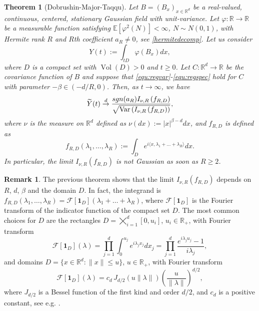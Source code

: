 \documentclass[12pt]{article}
\DeclareMathOperator{\var}{Var}
\DeclareMathOperator{\1}{1}
\DeclareMathOperator{\vol}{Vol}
\newcommand{\R}{\mathbb{R}}
\newcommand{\E}{\mathbb{E}}
\newcommand{\f}{\varphi}
\theoremstyle{plain}
\newtheorem{theorem}{Theorem}
\theoremstyle{definition}
\newtheorem{remark}{Remark}
\begin{document}
\begin{theorem}[Dobrushin-Major-Taqqu]\label{thm:DM}
 Let $B=(B_x)_{x\in\R^d}$ be a real-valued, continuous, centered, stationary Gaussian field with unit-variance. Let $\f:\R \rightarrow \R$ be a measurable function satisfying $\E[\varphi^2(N)]<\infty$, $N\sim N(0,1)$, with Hermite rank $R$ and $R$th coefficient $a_R\neq0$, see \eqref{hermitedecomp}. Let us consider 
 \[
 Y(t):= \int_{tD} \f(B_x) dx,
 \]
 where $D$ is a compact set with $\vol(D)>0$ and $t\ge0$.
 Let $C:\R^d \rightarrow \R$ be the covariance function of $B$ and suppose that \eqref{equ:regvar}-\eqref{equ:regspec} hold for $C$ with parameter $-\beta\in(-d/R,0)$. Then, as $t\rightarrow\infty$, we have 
\begin{equation}
             \widetilde{Y}(t)\overset{d}{\rightarrow} \frac{{\rm sgn(a_R)}I_{\nu,R}\left(f_{R,D}\right)}{\sqrt{\var\left(I_{\nu,R}\left(f_{R,D}\right)\right)}},
         \end{equation}
     where $\nu$ is the measure on $\R^{d}$ defined as $\nu(dx) :=  |x|^{\beta-d} dx$, and $f_{R,D}$ is defined as
     \begin{equation}
    f_{R,D}(\lambda_1,\dots,\lambda_R) := \int_{D} e^{i\langle x,\lambda_1+\dots+\lambda_R\rangle} dx.
\end{equation}
    In particular, the limit $I_{\nu,R}\left(f_{R,D}\right)$ is not Gaussian as soon as $R\ge2$.
 \end{theorem}

\begin{remark}\label{rem:domainsfourier}
    The previous theorem shows that the limit $I_{\nu,R}\left(f_{R,D}\right)$ depends on $R$, $d$, $\beta$ and the domain $D$. In fact, the integrand is $f_{R,D}(\lambda_1,\dots,\lambda_R)=\mathcal{F}[\mathbf{1}_D](\lambda_1+\dots+\lambda_R)$, where  $\mathcal{F}[\mathbf{1}_D]$ is the Fourier transform of the indicator function of the compact set $D$. The most common choices for $D$ are the rectangles $D=\bigtimes_{i=1}^d[0,u_i]$, $u_i\in \R_+$, with Fourier transform 
    \[
    \mathcal{F}[\mathbf{1}_D](\lambda)=\prod_{j=1}^d \int_0^{u_j}e^{i\lambda_jx_j}dx_j=\prod_{j=1}^d \frac{e^{i\lambda_ju_j}-1}{i\lambda_j},
    \]
    and domains $D=\{x\in\R^d:\|x\|\le u\}$, $u\in\R_+$, with Fourier transform
    \[
    \mathcal{F}[\mathbf{1}_D](\lambda)=c_d \,J_{d/2}(u\|\lambda\|)\left(\frac{u}{\| \lambda\|}\right)^{d/2},
    \]
    where $J_{d/2}$ is a Bessel function of the first kind and order $d/2$, and $c_d$ is a positive constant, see e.g. \cite[Section 2.2]{MN22}.
\end{remark} 
\end{document}
